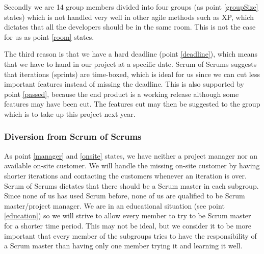 \documentclass{article}
\begin{document}
Secondly we are 14 group members divided into four groups (as point \ref{groupSize} states) which is not handled very well in other agile methods such as XP, which dictates that all the developers should be in the same room. 
This is not the case for us as point \ref{room} states.

The third reason is that we have a hard deadline (point \ref{deadline}), which means that we have to hand in our project at a specific date.
Scrum of Scrums suggests that iterations (sprints) are time-boxed, which is ideal for us since we can cut less important features instead of missing the deadline.
This is also supported by point \ref{passed}, because the end product is a working release although some features may have been cut.
The features cut may then be suggested to the group which is to take up this project next year.



\subsubsection{Diversion from Scrum of Scrums}
As point \ref{manager} and \ref{onsite} states, we have neither a project manager nor an available on-site customer.
We will handle the missing on-site customer by having shorter iterations and contacting the customers whenever an iteration is over.
Scrum of Scrums dictates that there should be a Scrum master in each subgroup.
Since none of us has used Scrum before, none of us are qualified to be Scrum master/project manager.
We are in an educational situation (see point \ref{education}) so we will strive to allow every member to try to be Scrum master for a shorter time period.
This may not be ideal, but we consider it to be more important that every member of the subgroups tries to have the responsibility of a Scrum master than having only one member trying it and learning it well.








\end{document}
